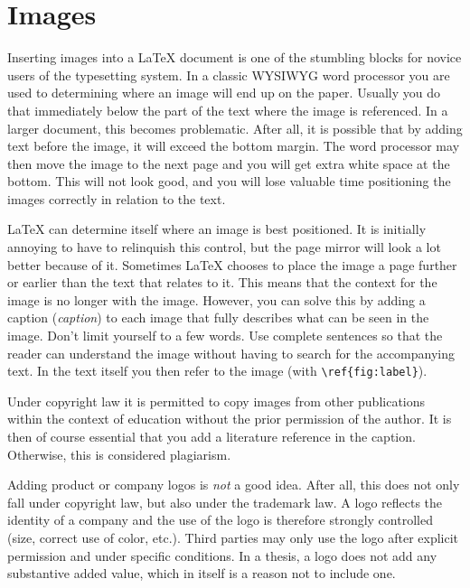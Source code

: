 %

\section{Images}
\label{sec:images}

Inserting images into a {\LaTeX} document is one of the stumbling blocks for novice users of the typesetting system. In a classic WYSIWYG word processor you are used to determining where an image will end up on the paper. Usually you do that immediately below the part of the text where the image is referenced. In a larger document, this becomes problematic. After all, it is possible that by adding text before the image, it will exceed the bottom margin. The word processor may then move the image to the next page and you will get extra white space at the bottom. This will not look good, and you will lose valuable time positioning the images correctly in relation to the text.

{\LaTeX} can determine itself where an image is best positioned. It is initially annoying to have to relinquish this control, but the page mirror will look a lot better because of it. Sometimes {\LaTeX} chooses to place the image a page further or earlier than the text that relates to it. This means that the context for the image is no longer with the image. However, you can solve this by adding a caption (\emph{caption}) to each image that fully describes what can be seen in the image. Don't limit yourself to a few words. Use complete sentences so that the reader can understand the image without having to search for the accompanying text. In the text itself you then refer to the image (with \verb|\ref{fig:label}|).


Under copyright law it is permitted to copy images from other publications within the context of education without the prior permission of the author. It is then of course essential that you add a literature reference in the caption. Otherwise, this is considered plagiarism.

Adding product or company logos is \emph{not} a good idea. After all, this does not only fall under copyright law, but also under the trademark law. A logo reflects the identity of a company and the use of the logo is therefore strongly controlled (size, correct use of color, etc.). Third parties may only use the logo after explicit permission and under specific conditions. In a thesis, a logo does not add any substantive added value, which in itself is a reason not to include one.


